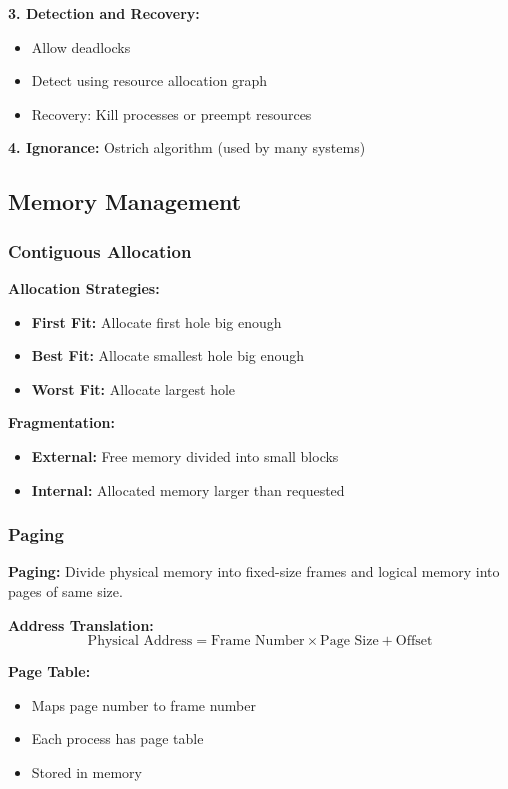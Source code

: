 \documentclass[11pt,a4paper]{article}
\begin{document}
\textbf{3. Detection and Recovery:}
\begin{itemize}
    \item Allow deadlocks
    \item Detect using resource allocation graph
    \item Recovery: Kill processes or preempt resources
\end{itemize}

\textbf{4. Ignorance:} Ostrich algorithm (used by many systems)

\subsection{Memory Management}

\subsubsection{Contiguous Allocation}

\textbf{Allocation Strategies:}
\begin{itemize}
    \item \textbf{First Fit:} Allocate first hole big enough
    \item \textbf{Best Fit:} Allocate smallest hole big enough
    \item \textbf{Worst Fit:} Allocate largest hole
\end{itemize}

\textbf{Fragmentation:}
\begin{itemize}
    \item \textbf{External:} Free memory divided into small blocks
    \item \textbf{Internal:} Allocated memory larger than requested
\end{itemize}

\subsubsection{Paging}

\begin{defbox}
\textbf{Paging:} Divide physical memory into fixed-size frames and logical memory into pages of same size.
\end{defbox}

\textbf{Address Translation:}
\[
    \text{Physical Address} = \text{Frame Number} \times \text{Page Size} + \text{Offset}
\]

\textbf{Page Table:}
\begin{itemize}
    \item Maps page number to frame number
    \item Each process has page table
    \item Stored in memory
\end{itemize}
\end{document}
